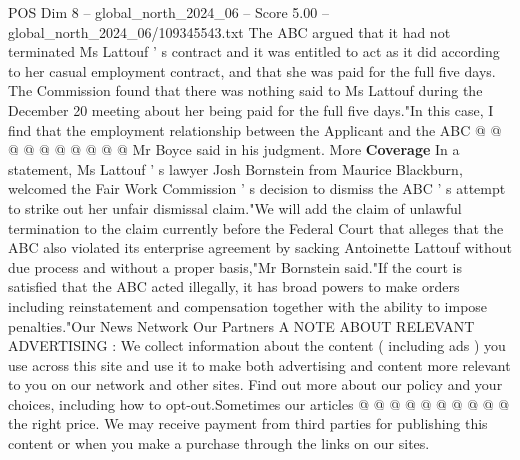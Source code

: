 \begin{textsample}{POS Dim 8 – global\_north\_2024\_06 – Score 5.00 – global\_north\_2024\_06/109345543.txt}
The ABC argued that it had not terminated Ms Lattouf ' s contract and it was entitled to act as it did according to her casual employment contract, and that she was paid for the full five days.
The Commission found that there was nothing said to Ms Lattouf during the December 20 meeting about her being paid for the full five days."In this case, I find that the employment relationship between the Applicant and the ABC @ @ @ @ @ @ @ @ @ @ Mr Boyce said in his judgment.
More \textbf{Coverage} In a statement, Ms Lattouf ' s lawyer Josh Bornstein from Maurice Blackburn, welcomed the Fair Work Commission ' s decision to dismiss the ABC ' s attempt to strike out her unfair dismissal claim."We will add the claim of unlawful termination to the claim currently before the Federal Court that alleges that the ABC also violated its enterprise agreement by sacking Antoinette Lattouf without due process and without a proper basis,"Mr Bornstein said."If the court is satisfied that the ABC acted illegally, it has broad powers to make orders including reinstatement and compensation together with the ability to impose penalties."Our News Network Our Partners A NOTE ABOUT RELEVANT ADVERTISING : We collect information about the content ( including ads ) you use across this site and use it to make both advertising and content more relevant to you on our network and other sites.
Find out more about our policy and your choices, including how to opt-out.Sometimes our articles @ @ @ @ @ @ @ @ @ @ the right price.
We may receive payment from third parties for publishing this content or when you make a purchase through the links on our sites.

\end{textsample}
